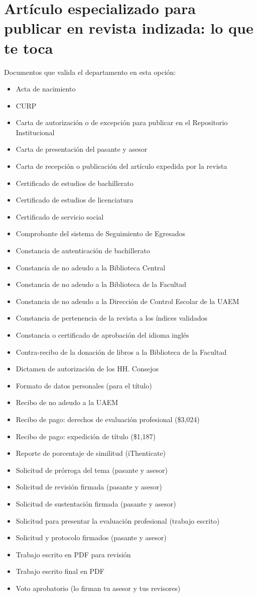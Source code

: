 \section{Artículo especializado para publicar en revista indizada: lo que te toca}
Documentos que valida el departamento en esta opción:
\begin{itemize}
  \item Acta de nacimiento
  \item CURP
  \item Carta de autorización o de excepción para publicar en el Repositorio Institucional
  \item Carta de presentación del pasante y asesor
  \item Carta de recepción o publicación del artículo expedida por la revista
  \item Certificado de estudios de bachillerato
  \item Certificado de estudios de licenciatura
  \item Certificado de servicio social
  \item Comprobante del sistema de Seguimiento de Egresados
  \item Constancia de autenticación de bachillerato
  \item Constancia de no adeudo a la Biblioteca Central
  \item Constancia de no adeudo a la Biblioteca de la Facultad
  \item Constancia de no adeudo a la Dirección de Control Escolar de la UAEM
  \item Constancia de pertenencia de la revista a los índices validados
  \item Constancia o certificado de aprobación del idioma inglés
  \item Contra-recibo de la donación de libros a la Biblioteca de la Facultad
  \item Dictamen de autorización de los HH. Consejos
  \item Formato de datos personales (para el título)
  \item Recibo de no adeudo a la UAEM
  \item Recibo de pago: derechos de evaluación profesional (\$3,024)
  \item Recibo de pago: expedición de título (\$1,187)
  \item Reporte de porcentaje de similitud (iThenticate)
  \item Solicitud de prórroga del tema (pasante y asesor)
  \item Solicitud de revisión firmada (pasante y asesor)
  \item Solicitud de sustentación firmada (pasante y asesor)
  \item Solicitud para presentar la evaluación profesional (trabajo escrito)
  \item Solicitud y protocolo firmados (pasante y asesor)
  \item Trabajo escrito en PDF para revisión
  \item Trabajo escrito final en PDF
  \item Voto aprobatorio (lo firman tu asesor y tus revisores)
\end{itemize}
